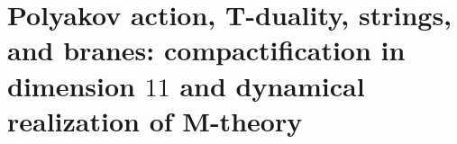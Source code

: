 \chapter{Polyakov action, T-duality, strings, and branes: compactification in dimension \texorpdfstring{\(11\)}{11} and dynamical realization of M-theory}
\label{chap:md-teoria-m-definitiva}
\begingroup
\let\HMTOwnerSection\section
\let\HMTOwnerSubsection\subsection
\let\HMTOwnerSubsubsection\subsubsection
\let\HMTOwnerParagraph\paragraph
\let\chapter\HMTOwnerSection
\let\section\HMTOwnerSubsection
\let\subsection\HMTOwnerSubsubsection
\let\subsubsection\HMTOwnerParagraph

\endgroup
\begingroup
\let\HMTOwnerSection\section
\let\HMTOwnerSubsection\subsection
\let\HMTOwnerSubsubsection\subsubsection
